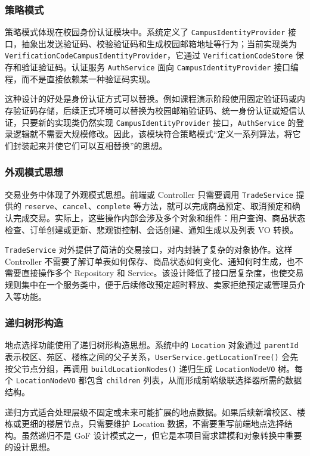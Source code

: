 ﻿\documentclass[UTF8,a4paper,12pt]{ctexart}
\begin{document}
\subsubsection{策略模式}
策略模式体现在校园身份认证模块中。系统定义了 \texttt{CampusIdentityProvider} 接口，抽象出发送验证码、校验验证码和生成校园邮箱地址等行为；当前实现类为 \texttt{VerificationCodeCampusIdentityProvider}，它通过 \texttt{VerificationCodeStore} 保存和验证验证码。认证服务 \texttt{AuthService} 面向 \texttt{CampusIdentityProvider} 接口编程，而不是直接依赖某一种验证码实现。

这种设计的好处是身份认证方式可以替换。例如课程演示阶段使用固定验证码或内存验证码存储，后续正式环境可以替换为校园邮箱验证码、统一身份认证或短信认证，只要新的实现类仍然实现 \texttt{CampusIdentityProvider} 接口，\texttt{AuthService} 的登录逻辑就不需要大规模修改。因此，该模块符合策略模式“定义一系列算法，将它们封装起来并使它们可以互相替换”的思想。

\subsubsection{外观模式思想}
交易业务中体现了外观模式思想。前端或 Controller 只需要调用 \texttt{TradeService} 提供的 \texttt{reserve}、\texttt{cancel}、\texttt{complete} 等方法，就可以完成商品预定、取消预定和确认完成交易。实际上，这些操作内部会涉及多个对象和组件：用户查询、商品状态检查、订单创建或更新、悲观锁控制、会话创建、通知生成以及列表 VO 转换。

\texttt{TradeService} 对外提供了简洁的交易接口，对内封装了复杂的对象协作。这样 Controller 不需要了解订单表如何保存、商品状态如何变化、通知何时生成，也不需要直接操作多个 Repository 和 Service。该设计降低了接口层复杂度，也使交易规则集中在一个服务类中，便于后续修改预定超时释放、卖家拒绝预定或管理员介入等功能。

\subsubsection{递归树形构造}
地点选择功能使用了递归树形构造思想。系统中的 \texttt{Location} 对象通过 \texttt{parentId} 表示校区、苑区、楼栋之间的父子关系，\texttt{UserService.getLocationTree()} 会先按父节点分组，再调用 \texttt{buildLocationNodes()} 递归生成 \texttt{LocationNodeVO} 树。每个 \texttt{LocationNodeVO} 都包含 \texttt{children} 列表，从而形成前端级联选择器所需的数据结构。

递归方式适合处理层级不固定或未来可能扩展的地点数据。如果后续新增校区、楼栋或更细的楼层节点，只需要维护 Location 数据，不需要重写前端地点选择结构。虽然递归不是 GoF 设计模式之一，但它是本项目需求建模和对象转换中重要的设计思想。
\end{document}
